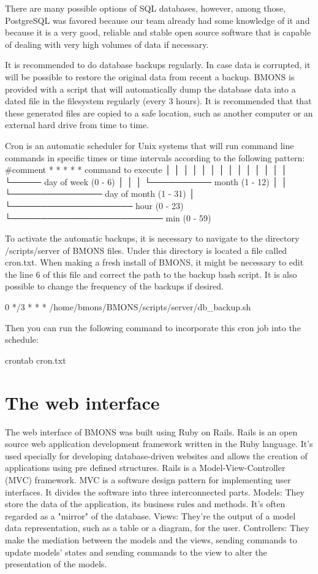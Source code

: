 There are many possible options of SQL databases, however, among those, PostgreSQL was favored because our team already had some knowledge of it and because it is a very good, reliable and stable open source software that is capable of dealing with very high volumes of data if necessary.

It is recommended to do database backups regularly. In case data is corrupted, it will be possible to restore the original data from recent a backup. BMONS is provided with a script that will automatically dump the database data into a dated file in the filesystem regularly (every 3 hours). It is recommended that that these generated files are copied to a safe location, such as another computer or an external hard drive from time to time.

Cron is an automatic scheduler for Unix systems that will run command line commands in specific times or time intervals according to the following pattern:
  #comment
  * * * * *  command to execute
  │ │ │ │ │
  │ │ │ │ │
  │ │ │ │ └───── day of week (0 - 6)
  │ │ │ └────────── month (1 - 12)
  │ │ └─────────────── day of month (1 - 31)
  │ └──────────────────── hour (0 - 23)
  └───────────────────────── min (0 - 59)

To activate the automatic backups, it is necessary to navigate to the directory /scripts/server of BMONS files. Under this directory is located a file called cron.txt. When making a fresh install of BMONS, it might be necessary to edit the line 6 of this file and correct the path to the backup bash script. It is also possible to change the frequency of the backups if desired. 
 
0 */3 * * * /home/bmons/BMONS/scripts/server/db_backup.sh

Then you can run the following command to incorporate this cron job into the schedule:

crontab cron.txt

\section{The web interface}

The web interface of BMONS was built using Ruby on Rails. Rails is an open source web application development framework written in the Ruby language. It's used specially for developing database-driven websites and allows the creation of applications using pre defined structures. Rails is a Model-View-Controller (MVC) framework. MVC is a software design pattern for implementing user interfaces. It divides the software into three interconnected parts. 
Models: They store the data of the application, its business rules and methods. It's often regarded as a "mirror" of the database.
Views: They're the output of a model data representation, such as a table or a diagram, for the user.
Controllers: They make the mediation between the models and the views, sending commands to update models' states and sending commands to the view to alter the presentation of the models.


